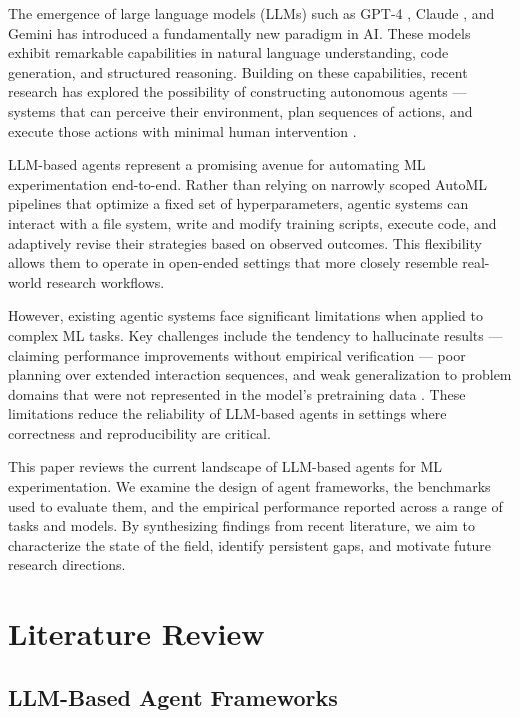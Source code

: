 \documentclass[conference]{IEEEtran}
\begin{document}
The emergence of large language models (LLMs) such as GPT-4 \cite{openai2023gpt4},
Claude \cite{anthropic2023claude}, and Gemini \cite{anil2023gemini} has introduced
a fundamentally new paradigm in AI. These models exhibit remarkable capabilities
in natural language understanding, code generation, and structured reasoning.
Building on these capabilities, recent research has explored the possibility of
constructing autonomous agents --- systems that can perceive their environment,
plan sequences of actions, and execute those actions with minimal human
intervention \cite{wang2023voyager,park2023generative}.

LLM-based agents represent a promising avenue for automating ML experimentation
end-to-end. Rather than relying on narrowly scoped AutoML pipelines that optimize
a fixed set of hyperparameters, agentic systems can interact with a file system,
write and modify training scripts, execute code, and adaptively revise their
strategies based on observed outcomes. This flexibility allows them to operate
in open-ended settings that more closely resemble real-world research workflows.

However, existing agentic systems face significant limitations when applied to
complex ML tasks. Key challenges include the tendency to hallucinate results ---
claiming performance improvements without empirical verification --- poor planning
over extended interaction sequences, and weak generalization to problem domains
that were not represented in the model's pretraining data \cite{huang2024mlagentbench}.
These limitations reduce the reliability of LLM-based agents in settings where
correctness and reproducibility are critical.

This paper reviews the current landscape of LLM-based agents for ML
experimentation. We examine the design of agent frameworks, the benchmarks used
to evaluate them, and the empirical performance reported across a range of tasks
and models. By synthesizing findings from recent literature, we aim to
characterize the state of the field, identify persistent gaps, and motivate
future research directions.


\section{Literature Review}

\subsection{LLM-Based Agent Frameworks}
\end{document}
